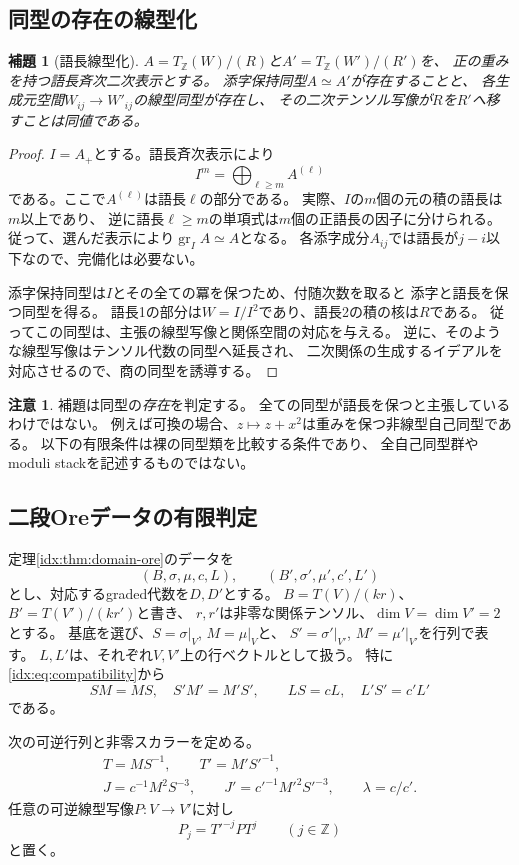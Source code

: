 \documentclass[11pt,a4paper]{ltjsarticle}
\newtheorem{lemma}[theorem]{補題}
\theoremstyle{definition}
\newtheorem{remark}[theorem]{注意}
\newcommand{\gr}{\operatorname{gr}}
\begin{document}
\subsection{同型の存在の線型化}
\begin{lemma}[語長線型化]\label{idx:lem:linearization}
$A=T_{\mathbb Z}(W)/(R)$と$A'=T_{\mathbb Z}(W')/(R')$を、
正の重みを持つ語長斉次二次表示とする。
添字保持同型$A\simeq A'$が存在することと、
各生成元空間$W_{ij}\to W'_{ij}$の線型同型が存在し、
その二次テンソル写像が$R$を$R'$へ移すことは同値である。
\end{lemma}
\begin{proof}
$I=A_+$とする。語長斉次表示により
\[
I^m=\bigoplus_{\ell\ge m}A^{(\ell)}
\]
である。ここで$A^{(\ell)}$は語長$\ell$の部分である。
実際、$I$の$m$個の元の積の語長は$m$以上であり、
逆に語長$\ell\ge m$の単項式は$m$個の正語長の因子に分けられる。
従って、選んだ表示により$\gr_I A\simeq A$となる。
各添字成分$A_{ij}$では語長が$j-i$以下なので、完備化は必要ない。

添字保持同型は$I$とその全ての冪を保つため、付随次数を取ると
添字と語長を保つ同型を得る。
語長1の部分は$W=I/I^2$であり、語長2の積の核は$R$である。
従ってこの同型は、主張の線型写像と関係空間の対応を与える。
逆に、そのような線型写像はテンソル代数の同型へ延長され、
二次関係の生成するイデアルを対応させるので、商の同型を誘導する。
\end{proof}

\begin{remark}
補題は同型の\emph{存在}を判定する。
全ての同型が語長を保つと主張しているわけではない。
例えば可換の場合、$z\mapsto z+x^2$は重みを保つ非線型自己同型である。
以下の有限条件は裸の同型類を比較する条件であり、
全自己同型群やmoduli stackを記述するものではない。
\end{remark}

\subsection{二段Oreデータの有限判定}
定理\ref{idx:thm:domain-ore}のデータを
\[
(B,\sigma,\mu,c,L),\qquad
(B',\sigma',\mu',c',L')
\]
とし、対応するgraded代数を$D,D'$とする。
$B=T(V)/(kr)$、$B'=T(V')/(kr')$と書き、
$r,r'$は非零な関係テンソル、$\dim V=\dim V'=2$とする。
基底を選び、$S=\sigma|_V$, $M=\mu|_V$と、
$S'=\sigma'|_{V'}$, $M'=\mu'|_{V'}$を行列で表す。
$L,L'$は、それぞれ$V,V'$上の行ベクトルとして扱う。
特に\eqref{idx:eq:compatibility}から
\[
SM=MS,\quad S'M'=M'S',\qquad
LS=cL,\quad L'S'=c'L'
\]
である。

次の可逆行列と非零スカラーを定める。
\begin{equation}\label{idx:eq:isomorphism-operators}
\begin{gathered}
T=MS^{-1},\qquad T'=M'S'^{-1},\\
J=c^{-1}M^2S^{-3},\qquad
J'=c'^{-1}M'^2S'^{-3},\qquad
\lambda=c/c'.
\end{gathered}
\end{equation}
任意の可逆線型写像$P:V\to V'$に対し
\[
P_j=T'^{-j}PT^j\qquad(j\in\mathbb Z)
\]
と置く。
\end{document}
